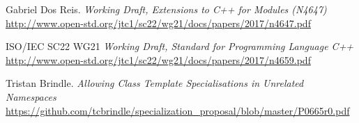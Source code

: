 \documentclass[reqno]{article}
\begin{document}
\begin{thebibliography}{9}

    Gabriel Dos Reis.
        \textit{Working Draft, Extensions to C++ for Modules (N4647)}
        \url{http://www.open-std.org/jtc1/sc22/wg21/docs/papers/2017/n4647.pdf}

    ISO/IEC SC22 WG21
        \textit{Working Draft, Standard for Programming Language C++}
        \url{http://www.open-std.org/jtc1/sc22/wg21/docs/papers/2017/n4659.pdf}

    Tristan Brindle.
        \textit{Allowing Class Template Specialisations in Unrelated Namespaces}
        \url{https://github.com/tcbrindle/specialization_proposal/blob/master/P0665r0.pdf}

\end{thebibliography}
\end{document}

